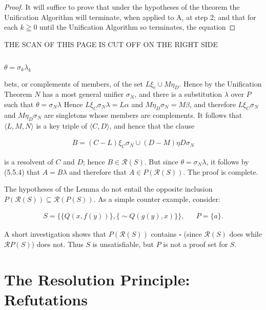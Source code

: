\documentclass[8pt]{extarticle}
\begin{document}
\begin{proof}
It will suffice to prove that under the hypotheses of the theorem the
Unification Algorithm will terminate, when applied to A, at step 2; and that
for each $k \geqq 0$  until the Unification Algorithm so terminates, the equation
\end{proof}

\newpage

THE SCAN OF THIS PAGE IS CUT OFF ON THE RIGHT SIDE

\subsection{}
$\theta = \sigma_k\lambda_k$

\newpage
\noindent
bets, or complements of members, of the set $L\xi_c \cup M\eta_D$. Hence by the Unification Theorem $N$ has a most general unifier $\sigma_N$, and there is a substitution $\lambda$ over $P$ such that $\theta = \sigma_N\lambda$ Hence $L\xi_C \sigma_N\lambda = L\alpha$ and $M\eta _D\sigma_N = M\beta$, and therefore $L\xi_C\sigma_N$ and $M\eta_D\sigma_N$ are singletons whose members are complements. It follows that $\langle L, M, N\rangle$ is a key triple of $\langle C, D\rangle$, and hence that the clause

\begin{align*}
    B = (C - L)\xi_C\sigma_N \cup (D - M)\eta D\sigma_N
\end{align*}

is a resolvent of $C$ and $D$; hence $B \in \mathscr{R}(S)$. But since $\theta = \sigma_N\lambda$, it follows by (5.5.4) that $A = B\lambda$ and therefore that $A \in P(\mathscr{R}(S))$. The proof is complete.

The hypotheses of the Lemma do not entail the opposite inclusion $P(\mathscr{R}(S)) \subseteq \mathscr{R}(P(S))$. As a simple counter example, consider:

\begin{align*}
    S = \{\{Q(x,f(y))\},\{\sim Q(g(y),x)\}\}, && P = \{a\}.
\end{align*}

A short investigation shows that $P(\mathscr{R}(S))$ contains $\square$ (since $\mathscr{R}(S)$ does while $\mathscr{R}P(S))$ does not. Thus $S$ is unsatisfiable, but $P$ is not a proof set for $S$.

\section{The Resolution Principle: Refutations}
\end{document}
